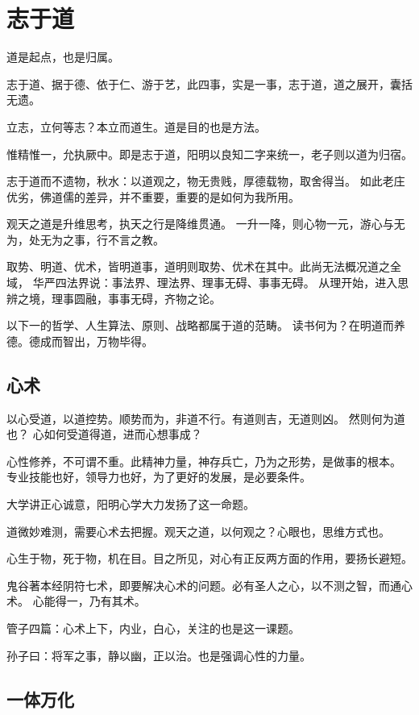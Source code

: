 \chapter{志于道}

道是起点，也是归属。

志于道、据于德、依于仁、游于艺，此四事，实是一事，志于道，道之展开，囊括无遗。

立志，立何等志？本立而道生。道是目的也是方法。

惟精惟一，允执厥中。即是志于道，阳明以良知二字来统一，老子则以道为归宿。

志于道而不遗物，秋水：以道观之，物无贵贱，厚德载物，取舍得当。
如此老庄优劣，佛道儒的差异，并不重要，重要的是如何为我所用。

观天之道是升维思考，执天之行是降维贯通。
一升一降，则心物一元，游心与无为，处无为之事，行不言之教。

取势、明道、优术，皆明道事，道明则取势、优术在其中。此尚无法概况道之全域，
华严四法界说：事法界、理法界、理事无碍、事事无碍。
从理开始，进入思辨之境，理事圆融，事事无碍，齐物之论。

以下一的哲学、人生算法、原则、战略都属于道的范畴。
读书何为？在明道而养德。德成而智出，万物毕得。

\section{心术}

以心受道，以道控势。顺势而为，非道不行。有道则吉，无道则凶。
然则何为道也？ 心如何受道得道，进而心想事成？

心性修养，不可谓不重。此精神力量，神存兵亡，乃为之形势，是做事的根本。
专业技能也好，领导力也好，为了更好的发展，是必要条件。

大学讲正心诚意，阳明心学大力发扬了这一命题。

道微妙难测，需要心术去把握。观天之道，以何观之？心眼也，思维方式也。

心生于物，死于物，机在目。目之所见，对心有正反两方面的作用，要扬长避短。

鬼谷著本经阴符七术，即要解决心术的问题。必有圣人之心，以不测之智，而通心术。
心能得一，乃有其术。

管子四篇：心术上下，内业，白心，关注的也是这一课题。

孙子曰：将军之事，静以幽，正以治。也是强调心性的力量。

\section{一体万化}

